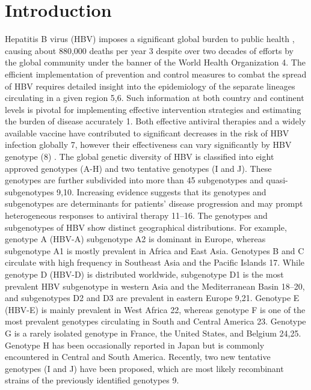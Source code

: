 \section{Introduction}
Hepatitis B virus (HBV) imposes a significant global burden to public health \cite{pourkarim2011molecular,malik2022viral}, causing about 880,000 deaths per year 3 despite over two decades of efforts by the global community under the banner of the World Health Organization 4. The efficient implementation of prevention and control measures to combat the spread of HBV requires detailed insight into the epidemiology of the separate lineages circulating in a given region 5,6. Such information at both country and continent levels is pivotal for implementing effective intervention strategies and estimating the burden of disease accurately 1. Both effective antiviral therapies and a widely available vaccine have contributed to significant decreases in the risk of HBV infection globally 7, however their effectiveness can vary significantly by HBV genotype (8) . 
The global genetic diversity of HBV is classified into eight approved genotypes (A-H) and two tentative genotypes (I and J). These genotypes are further subdivided into more than 45 subgenotypes and quasi-subgenotypes 9,10. Increasing evidence suggests that its genotypes and subgenotypes are determinants for patients' disease progression and may prompt heterogeneous responses to antiviral therapy 11--16. The genotypes and subgenotypes of HBV show distinct geographical distributions. For example, genotype A (HBV-A) subgenotype A2 is dominant in Europe, whereas subgenotype A1 is mostly prevalent in Africa and East Asia. Genotypes B and C circulate with high frequency in Southeast Asia and the Pacific Islands 17. While genotype D (HBV-D) is distributed worldwide, subgenotype D1 is the most prevalent HBV subgenotype in western Asia and the Mediterranean Basin 18--20, and subgenotypes D2 and D3 are prevalent in eastern Europe 9,21. Genotype E (HBV-E) is mainly prevalent in West Africa 22, whereas genotype F is one of the most prevalent genotypes circulating in South and Central America 23. Genotype G is a rarely isolated genotype in France, the United States, and Belgium 24,25. Genotype H has been occasionally reported in Japan but is commonly encountered in Central and South America. Recently, two new tentative genotypes (I and J) have been proposed, which are most likely recombinant strains of the previously identified genotypes 9. 
